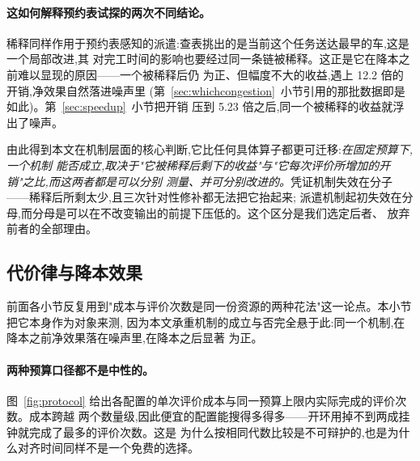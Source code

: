 \documentclass[manuscript,screen,review]{acmart}
\newcommand{\CostMultBefore}{12.2}
\newcommand{\CostMultAfter}{5.23}
\begin{document}
\paragraph{这如何解释预约表试探的两次不同结论。}
稀释同样作用于预约表感知的派遣:查表挑出的是当前这个任务送达最早的车,这是一个局部改进,其
对完工时间的影响也要经过同一条链被稀释。这正是它在降本之前难以显现的原因——一个被稀释后仍
为正、但幅度不大的收益,遇上 \CostMultBefore{} 倍的开销,净效果自然落进噪声里
(第~\ref{sec:whichcongestion}~小节引用的那批数据即是如此)。第~\ref{sec:speedup}~小节把开销
压到 \CostMultAfter{} 倍之后,同一个被稀释的收益就浮出了噪声。

由此得到本文在机制层面的核心判断,它比任何具体算子都更可迁移:\emph{在固定预算下,一个机制
能否成立,取决于"它被稀释后剩下的收益"与"它每次评价所增加的开销"之比,而这两者都是可以分别
测量、并可分别改进的。}凭证机制失效在分子——稀释后所剩太少,且三次针对性修补都无法把它抬起来;
派遣机制起初失效在分母,而分母是可以在不改变输出的前提下压低的。这个区分是我们选定后者、
放弃前者的全部理由。

\subsection{代价律与降本效果}
\label{sec:costlaw}

前面各小节反复用到"成本与评价次数是同一份资源的两种花法"这一论点。本小节把它本身作为对象来测,
因为本文承重机制的成立与否完全悬于此:同一个机制,在降本之前净效果落在噪声里,在降本之后显著
为正。

\paragraph{两种预算口径都不是中性的。}
图~\ref{fig:protocol} 给出各配置的单次评价成本与同一预算上限内实际完成的评价次数。成本跨越
两个数量级,因此便宜的配置能搜得多得多——开环用掉不到两成挂钟就完成了最多的评价次数。这是
为什么按相同代数比较是不可辩护的,也是为什么对齐时间同样不是一个免费的选择。
\end{document}
